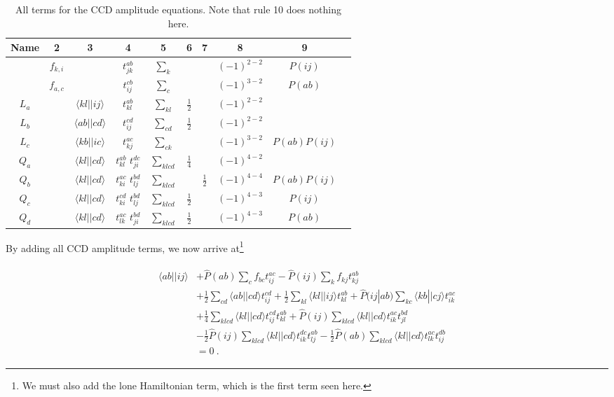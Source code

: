 	\begin{table}[h]
	\centering
	\caption{All terms for the CCD amplitude equations. Note that rule 10 does nothing here.}
	\begin{tabular}{cccccccccc}
		Name & 2 & 3 & 4 & 5 & 6 & 7 & 8 & 9 & \\ \hline
		& $f_{k,i}$ &  & $t_{jk}^{ab}$ & $\sum_{k}$ &  &  & $(-1)^{2-2}$ & $P(ij)$ &\\
		& $f_{a,c}$ &  & $t_{ij}^{cb}$ & $\sum_{c}$ &  &  & $(-1)^{3-2}$ & $P(ab)$ &\\
		$L_a$ & & $\langle kl||ij \rangle$ & $t_{kl}^{ab}$ & $\sum_{kl}$ & $\frac{1}{2}$ &  & $(-1)^{2-2}$ &  &\\
		$L_b$ & & $\langle ab||cd \rangle$ & $t_{ij}^{cd}$ & $\sum_{cd}$ & $\frac{1}{2}$ &  & $(-1)^{2-2}$ &  &\\
		$L_c$ & & $\langle kb||ic \rangle$ & $t_{kj}^{ac}$ & $\sum_{ck}$ &  &  & $(-1)^{3-2}$ & $P(ab)P(ij)$ &\\
		$Q_a$ & & $\langle kl||cd \rangle$ & $t_{kl}^{ab}$ $t_{ji}^{dc}$ & $\sum_{klcd}$ & $\frac{1}{4}$ &  & $(-1)^{4-2}$ &  &\\
		$Q_b$ & & $\langle kl||cd \rangle$ & $t_{ki}^{ac}$ $t_{lj}^{bd}$ & $\sum_{klcd}$ &  & $\frac{1}{2}$ & $(-1)^{4-4}$ & $P(ab)P(ij)$ &\\
		$Q_c$ & & $\langle kl||cd \rangle$ & $t_{ki}^{cd}$ $t_{lj}^{bd}$ & $\sum_{klcd}$ & $\frac{1}{2}$ &  & $(-1)^{4-3}$ & $P(ij)$ &\\
		$Q_d$ & & $\langle kl||cd \rangle$ & $t_{lk}^{ac}$ $t_{ji}^{bd}$ & $\sum_{klcd}$ & $\frac{1}{2}$ &  & $(-1)^{4-3}$ & $P(ab)$ &\\ \hline
	\end{tabular}
	\label{CC | table | "CCD amp eq derivation"}
	\end{table}
	
	By adding all CCD amplitude terms, we now arrive at\footnote{We must also add the lone Hamiltonian term, which is the first term seen here.}
	
	\begin{align}
		\begin{split}
		\langle ab||ij\rangle &+ \hat{P}(ab)\sum_{c}f_{bc}t_{ij}^{ac} - \hat{P}(ij)\sum_{k}f_{kj}t_{kj}^{ab}\\
		&+ \frac{1}{2}\sum_{cd}\langle ab||cd\rangle t_{ij}^{cd} + \frac{1}{2}\sum_{kl}\langle kl||ij\rangle t_{kl}^{ab} + \hat{P}(ij|ab)\sum_{kc}\langle kb||cj\rangle t_{ik}^{ac}\\
		&+ \frac{1}{4}\sum_{klcd}\langle kl||cd\rangle t_{ij}^{cd}t_{kl}^{ab} + \hat{P}(ij)\sum_{klcd}\langle kl||cd\rangle t_{ik}^{ac}t_{jl}^{bd}\\
		&- \frac{1}{2}\hat{P}(ij)\sum_{klcd}\langle kl||cd\rangle t_{ik}^{dc}t_{lj}^{ab} - \frac{1}{2}\hat{P}(ab)\sum_{klcd}\langle kl||cd\rangle t_{lk}^{ac}t_{ij}^{db}\\
		&= 0\:.
		\end{split}
	\end{align}
	
